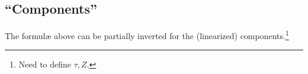 \documentclass[letter,12pt]{article} %
\def\physical#1{ {\color{green} {\bm {#1}} } }
\def\frameXX{ \physical{e} }
\def\frameXY{ \physical{e} }
\def\frameYX{ \physical{e} }
\def\frameYY{ \physical{e} }
\def\CXXX{ \physical{C} }
\def\CXXY{ \physical{C} }
\def\CXYY{ \physical{C} }
\def\CYYY{ \physical{C} }
\def\X{X}
\def\T{T}
\begin{document}
\subsection{``Components''}
The formul\ae{} above can be partially inverted for the (linearized) components.\footnote{Need to define $\tau, Z$.} 
\end{document}

